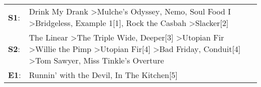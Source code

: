 \begin{supertabular}{p{0.03\textwidth}p{0.92\textwidth}}
 \textbf{S1}:  &                                                                                                                                  Drink My Drank\textsuperscript{} \textgreater \enspace Mulche's Odyssey\textsuperscript{}, \enspace Nemo\textsuperscript{}, \enspace Soul Food I\textsuperscript{} \textgreater \enspace Bridgeless\textsuperscript{}, \enspace Example 1[1]\textsuperscript{}, \enspace Rock the Casbah\textsuperscript{} \textgreater \enspace Slacker[2]\textsuperscript{}  \enspace  \\
 \textbf{S2}:  &  The Linear\textsuperscript{} \textgreater \enspace The Triple Wide\textsuperscript{}, \enspace Deeper[3]\textsuperscript{} \textgreater \enspace Utopian Fir\textsuperscript{} \textgreater \enspace Willie the Pimp\textsuperscript{} \textgreater \enspace Utopian Fir[4]\textsuperscript{} \textgreater \enspace Bad Friday\textsuperscript{}, \enspace Conduit[4]\textsuperscript{} \textgreater \enspace Tom Sawyer\textsuperscript{}, \enspace Miss Tinkle's Overture\textsuperscript{}  \enspace  \\
 \textbf{E1}:  &                                                                                                                                                                                                                                                                                                                                                                                                         Runnin' with the Devil\textsuperscript{}, \enspace In The Kitchen[5]\textsuperscript{}  \enspace  \\
\end{supertabular}
